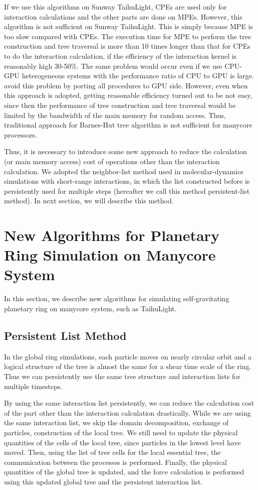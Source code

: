 \documentclass[]{pasj01}
\begin{document}
If we use this algorithms on Sunway TaihuLight, CPEs are used only for
interaction calculations and the other parts are done on
MPEs. However, this algorithm is not sufficient on Sunway
TaihuLight. This is simply because MPE is too slow compared with
CPEs. The execution time for MPE to perform the tree construction and
tree traversal is more than 10 times longer than that for CPEs to do
the interaction calculation, if the efficiency of the interaction
kernel is reasonably high 30-50\%. The same problem would occur even
if we use CPU-GPU heterogeneous systems with the performance ratio of
CPU to GPU is large. \citet{Bedorfetal2014} avoid this problem by
porting all procedures to GPU side. However, even when this approach
is adopted, getting reasonable efficiency turned out to be not easy,
since then the performance of tree construction and tree traversal
would be limited by the bandwidth of the main memory for random
access.  Thus, traditional approach for Barnes-Hut tree algorithm is
not sufficient for manycore processors.

Thus, it is necessary to introduce some new approach to reduce the
calculation (or main memory access) cost of operations other than the
interaction calculation. We adopted the neighbor-list method used in
molecular-dynamics simulations with short-range interactions, in which
the list constructed before is persistently used for multiple steps
(hereafter we call this method persistent-list method). In next
section, we will describe this method.

\section{New Algorithms for Planetary Ring Simulation on Manycore System}
\label{sec:impl1}

In this section, we describe new algorithms for simulating
self-gravitating planetary ring on manycore system, such as
TaihuLight.

\subsection{Persistent List Method}
\label{subsec:list}

In the global ring simulations, each particle moves on nearly circular
orbit and a logical structure of the tree is almost the same for a
shear time scale of the ring. Thus we can persistently use the same
tree structure and interaction lists for multiple timesteps.

By using the same interaction list persistently, we can reduce the
calculation cost of the part other than the interaction calculation
drastically. While we are using the same interaction list, we skip the
domain decomposition, exchange of particles, construction of the local
tree. We still need to update the physical quantities of the cells of
the local tree, since particles in the lowest level have moved. Then,
using the list of tree cells for the local essential tree, the
communication between the processes is performed. Finally, the
physical quantities of the global tree is updated, and the force
calculation is performed using this updated global tree and the
persistent interaction list.
\end{document}
